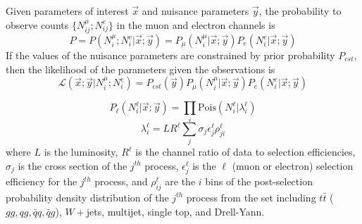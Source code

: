 \documentclass{article}
\newcommand{\lik}{\mathcal{L}}
\newcommand{\interest}{\vec{x}}
\newcommand{\nuis}{\vec{y}}
\begin{document}
Given parameters of interest $\interest$ and nuisance parameters
$\nuis$, the probability to observe counts $\{N_{ij}^{\mu};N_{ij}^e\}$
in the muon and electron channels is
\[P 
= P\left(N_i^{\mu};N_i^e | \interest;\nuis\right) =
P_{\mu}\left(N_i^{\mu}|\interest;\nuis\right)P_e\left(N_i^e|\interest;\nuis\right)\]
If the values of the nuisance parameters are constrained by prior
probability $P_{cst}$, then the likelihood of the parameters given the
observations is
\begin{equation}
  \lik\left(\interest;\nuis|N_i^{\mu};N_i^e\right) = P_{cst}(\nuis)P_{\mu}(N_i^\mu|\interest;\nuis)P_e(N_i^e|\interest;\nuis)
\end{equation}


\begin{equation}
  P_\ell\left(N_i^\ell|\interest;\nuis\right) = \prod_i \mathrm{Pois}\left(N_i^\ell|\lambda_i^\ell\right)
\end{equation}
\begin{equation}
  \lambda_i^\ell = LR^\ell\sum_j\sigma_j\epsilon_j^\ell\rho_{ji}^\ell
\end{equation}
where $L$ is the luminosity, $R^\ell$ is the channel ratio of data to
selection efficiencies, $\sigma_j$ is the cross section of the
$j^{th}$ process, $\epsilon^\ell_j$ is the $\ell$ (muon or electron)
selection efficiency for the $j^{th}$ process, and $\rho^\ell_{ij}$
are the $i$ bins of the post-selection probability density
distribution of the $j^{th}$ process from the set including $t\bar{t}$
($gg,qg,\bar{q}q,\bar{q}g$), $W+$jets, multijet, single top, and
Drell-Yann.
\end{document}
